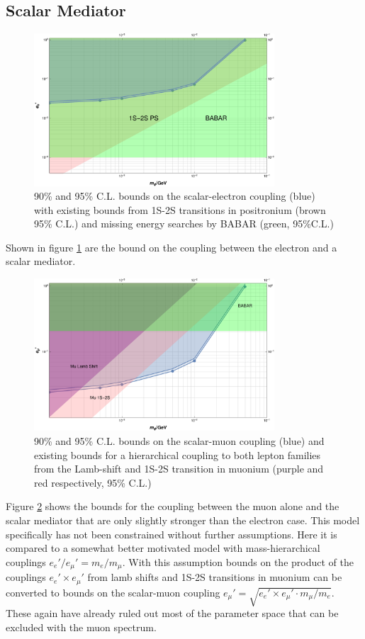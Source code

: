 \subsection{Scalar Mediator}

\begin{figure}[!ht]
  \centering
    \includegraphics[width=0.8\textwidth]{imgs/MuBoundOnScalarElectron.pdf}
    \caption{90\% and 95\% C.L. bounds on the scalar-electron coupling (blue) with existing bounds from 1S-2S transitions in positronium (brown 95\% C.L.) and missing energy searches by BABAR (green, 95\%C.L.) \cite{Essig:2013vha}}
    \label{fg:MuBoundScEl}
\end{figure}
Shown in figure \ref{fg:MuBoundScEl} are the bound on the coupling between the electron and a scalar mediator. 

\begin{figure}[!ht]
  \centering
    \includegraphics[width=0.8\textwidth]{imgs/MuBoundOnScalarMuon.pdf}
    \caption{90\% and 95\% C.L. bounds on the scalar-muon coupling (blue) and existing bounds for a hierarchical coupling to both lepton families from the Lamb-shift and 1S-2S transition in muonium (purple and red respectively, 95\% C.L.)}
    \label{fg:MuBoundScMu}
\end{figure}
Figure \ref{fg:MuBoundScMu} shows the bounds for the coupling between the muon alone and the scalar mediator that are only slightly stronger than the electron case. This model specifically has not been constrained without further assumptions. Here it is compared to a somewhat better motivated model with mass-hierarchical couplings $e_e'/e_\mu'=m_e/m_\mu$. With this assumption bounds on the product of the couplings $e_e'\times e_\mu'$ from lamb shifts and 1S-2S transitions in muonium can be converted to bounds on the scalar-muon coupling $e_\mu' = \sqrt{e_e'\times e_\mu'\cdot m_\mu/m_e}$. These again have already ruled out most of the parameter space that can be excluded with the muon spectrum. 
